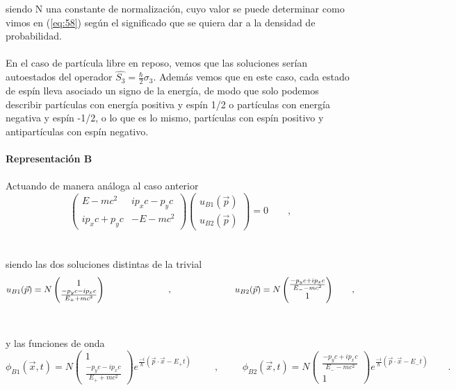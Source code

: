\documentclass[11pt,letterpaper]{article}     %
\begin{document}
siendo N una constante de normalización, cuyo valor se puede determinar como vimos en (\ref{eq:58}) según el significado que se quiera dar a la densidad de probabilidad. \\ \\
En el caso de partícula libre en reposo, vemos que las soluciones serían autoestados del operador $\hat{S_3}=\frac{\hbar}{2}\sigma_3$. Además vemos que en este caso, cada estado de espín lleva asociado un signo de la energía, de modo que solo podemos describir partículas con energía positiva y espín 1/2 o partículas con energía negativa y espín -1/2, o lo que es lo mismo, partículas con espín positivo y antipartículas con espín negativo. \\ \\
\textbf{Representación B} \\ \\
Actuando de manera análoga al caso anterior
\begin{equation} \label{eq:123}
\begin{pmatrix}
E -mc^2 & ip_xc-p_yc \\ ip_xc+p_yc & -E -mc^2
\end{pmatrix} 
\begin{pmatrix}
u_{B1}(\vec{p}) \\ u_{B2}(\vec{p})
\end{pmatrix}=0 \qquad ,
\end{equation} \\ \\
siendo las dos soluciones distintas de la trivial \\
\begin{equation} \label{eq:124}
u_{B1}(\vec{p})= N\begin{pmatrix}
1 \\ \frac{-p_yc-ip_xc}{E_+ +mc^2}
\end{pmatrix} \hspace{2.5cm}, \hspace{2.5cm}
u_{B2} (\vec{p})= N\begin{pmatrix}
\frac{-p_yc + i p_xc}{E_- -mc^2} \\ 1
\end{pmatrix} \qquad , 
\end{equation} \\ \\
y las funciones de onda \\
\begin{equation} \label{eq:125}
\phi_{B1} (\vec{x},t)=N 
\begin{pmatrix}
1 \\ \frac{-p_yc-ip_xc}{E_+ +mc^2}
\end{pmatrix} e^{\frac{-i}{\hbar}(\vec{p}\cdot \vec{x} -E_+ t)} \hspace{1cm} , \hspace{1cm}
\phi _{B2} (\vec{x},t)= N
\begin{pmatrix}
\frac{-p_yc+ip_xc}{E_- - mc^2} \\ 1
\end{pmatrix} e^{\frac{-i}{\hbar}(\vec{p}\cdot \vec{x} - E_- t)} \qquad .
\end{equation} \\ \\
\end{document}
